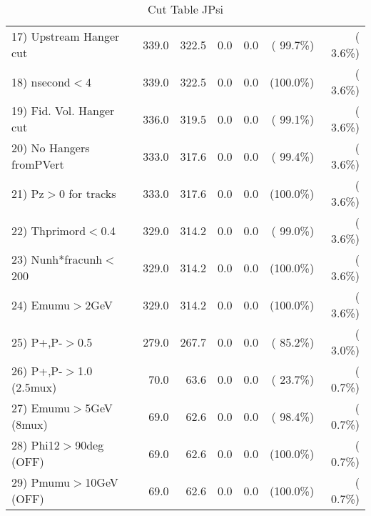 \begin{table}[h!]
\begin{tabular}{||l||r|r|r|r|r|r||}
 17) Upstream Hanger cut  &        339.0 &        322.5 &          0.0 &          0.0 & ( 99.7\%) & (  3.6\%) \\
 18) nsecond$<$4          &        339.0 &        322.5 &          0.0 &          0.0 & (100.0\%) & (  3.6\%) \\
 19) Fid. Vol. Hanger cut &        336.0 &        319.5 &          0.0 &          0.0 & ( 99.1\%) & (  3.6\%) \\
 20) No Hangers fromPVert &        333.0 &        317.6 &          0.0 &          0.0 & ( 99.4\%) & (  3.6\%) \\
 21) Pz$>$0 for tracks    &        333.0 &        317.6 &          0.0 &          0.0 & (100.0\%) & (  3.6\%) \\
 22) Thprimord$<$0.4      &        329.0 &        314.2 &          0.0 &          0.0 & ( 99.0\%) & (  3.6\%) \\
 23) Nunh*fracunh$<$200   &        329.0 &        314.2 &          0.0 &          0.0 & (100.0\%) & (  3.6\%) \\
 24) Emumu$>$2GeV         &        329.0 &        314.2 &          0.0 &          0.0 & (100.0\%) & (  3.6\%) \\
 25) P+,P-$>$0.5          &        279.0 &        267.7 &          0.0 &          0.0 & ( 85.2\%) & (  3.0\%) \\
 26) P+,P-$>$1.0 (2.5mux) &         70.0 &         63.6 &          0.0 &          0.0 & ( 23.7\%) & (  0.7\%) \\
 27) Emumu$>$5GeV  (8mux) &         69.0 &         62.6 &          0.0 &          0.0 & ( 98.4\%) & (  0.7\%) \\
 28) Phi12$>$90deg  (OFF) &         69.0 &         62.6 &          0.0 &          0.0 & (100.0\%) & (  0.7\%) \\
 29) Pmumu$>$10GeV  (OFF) &         69.0 &         62.6 &          0.0 &          0.0 & (100.0\%) & (  0.7\%) \\
 \hline
 \hline
 \end{tabular}
 \caption{Cut Table  JPsi     }
 \label{tab-cutcohjpsi-mumu_jpsi}
 \end{table}

